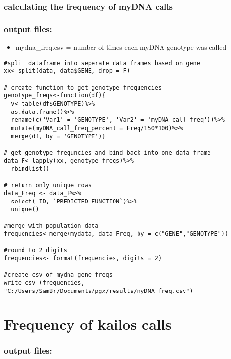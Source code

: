\documentclass[]{article}
\providecommand{\tightlist}{%
  \setlength{\itemsep}{0pt}\setlength{\parskip}{0pt}}
\begin{document}
\subsubsection{calculating the frequency of myDNA
calls}\label{calculating-the-frequency-of-mydna-calls}

\subsubsection{output files:}\label{output-files-1}

\begin{itemize}
\tightlist
\item
  mydna\_freq.csv = number of times each myDNA genotype was called
\end{itemize}

\begin{verbatim}
#split dataframe into seperate data frames based on gene 
xx<-split(data, data$GENE, drop = F)

# create function to get genotype frequencies 
genotype_freqs<-function(df){
  v<-table(df$GENOTYPE)%>%
  as.data.frame()%>%
  rename(c('Var1' = 'GENOTYPE', 'Var2' = 'myDNA_call_freq'))%>%
  mutate(myDNA_call_freq_percent = Freq/150*100)%>%
  merge(df, by = 'GENOTYPE')}

# get genotype frequncies and bind back into one data frame
data_F<-lapply(xx, genotype_freqs)%>%
  rbindlist()

# return only unique rows
data_Freq <- data_F%>%
  select(-ID,-`PREDICTED FUNCTION`)%>%
  unique()

#merge with population data
frequencies<-merge(mydata, data_Freq, by = c("GENE","GENOTYPE"))

#round to 2 digits
frequencies<- format(frequencies, digits = 2)

#create csv of mydna gene freqs
write_csv (frequencies, "C:/Users/SamBr/Documents/pgx/results/myDNA_freq.csv")
\end{verbatim}

\section{Frequency of kailos calls}\label{frequency-of-kailos-calls}

\subsubsection{output files:}\label{output-files-2}
\end{document}
